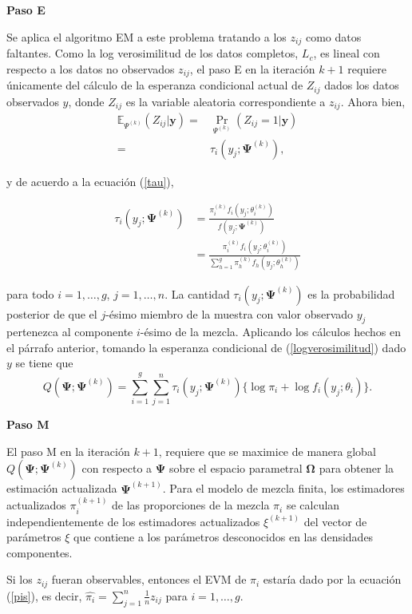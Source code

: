 \documentclass[
]{article}
\begin{document}
\textbf{Paso E}

Se aplica el algoritmo EM a este problema tratando a los \(z_{ij}\) como
datos faltantes. Como la log verosimilitud de los datos completos,
\(L_c\), es lineal con respecto a los datos no observados \(z_{ij}\), el
paso E en la iteración \(k+1\) requiere únicamente del cálculo de la
esperanza condicional actual de \(Z_{ij}\) dados los datos observados
\(y\), donde \(Z_{ij}\) es la variable aleatoria correspondiente a
\(z_{ij}\). Ahora bien, \begin{align}
\mathbb{E}_{ \Psi^{(k)} } ( Z_{ij}|\bm{y} )=& {\Pr}_{\Psi^(k)} (Z_{ij}=1|\bm{y})\\
=& \tau_i(y_j;\bm{\Psi}^{(k)}),
\end{align}

y de acuerdo a la ecuación (\ref{tau}),

\begin{align}
\tau_i( y_j;\bm{\Psi}^{(k)} ) &=
\frac{ \pi_i^{(k)} f_i(y_j;\theta_i^{(k)} )}{f(y_j;\bm{\Psi}^{(k)})}\\
&=\frac{\pi_i^{(k)} f_i( y_j;\theta_i^{(k)})}{\sum_{h=1}^g \pi_h^{(k)} f_h(y_j;\theta_h^{(k)})}
\end{align}

para todo \(i=1,\ldots,g\), \(j=1,\ldots,n\). La cantidad
\(\tau_i(y_j;\bm{\Psi}^{(k)})\) es la probabilidad posterior de que el
\(j\)-ésimo miembro de la muestra con valor observado \(y_j\) pertenezca
al componente \(i\)-ésimo de la mezcla. Aplicando los cálculos hechos en
el párrafo anterior, tomando la esperanza condicional de
(\ref{logverosimilitud}) dado \(y\) se tiene que \begin{equation}
Q(\bm{\Psi};\bm{\Psi}^{(k)})=\sum_{i=1}^{g} \sum_{j=1}^{n} \tau_i(y_j;\bm{\Psi}^{(k)}) \{\log \pi_i + \log f_i(y_j;\theta_i)\}\label{Q}.  
\end{equation}

\textbf{Paso M}

El paso M en la iteración \(k+1\), requiere que se maximice de manera
global \(Q(\bm{\Psi};\bm{\Psi}^{(k)})\) con respecto a \(\bm{\Psi}\)
sobre el espacio parametral \(\bm{\Omega}\) para obtener la estimación
actualizada \(\bm{\Psi}^{(k+1)}\). Para el modelo de mezcla finita, los
estimadores actualizados \(\pi_i^{(k+1)}\) de las proporciones de la
mezcla \(\pi_i\) se calculan independientemente de los estimadores
actualizados \(\xi^{(k+1)}\) del vector de parámetros \(\xi\) que
contiene a los parámetros desconocidos en las densidades componentes.

Si los \(z_{ij}\) fueran observables, entonces el EVM de \(\pi_i\)
estaría dado por la ecuación (\ref{pis}), es decir,
\(\hat{\pi_i}=\sum_{j=1}^{n}\frac{1}{n}z_{ij}\) para \(i=1,\ldots,g\).
\end{document}
